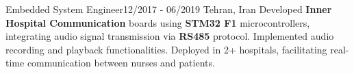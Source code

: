 \resumeSubheadingReza
{Embedded System Engineer}{12/2017 - 06/2019}
{}{Tehran, Iran}
{
    Developed \textbf{Inner Hospital Communication} boards using \textbf{STM32 F1} microcontrollers, integrating audio signal transmission via \textbf{RS485} protocol. Implemented audio recording and playback functionalities. Deployed in 2+ hospitals, facilitating real-time communication between nurses and patients.
}
